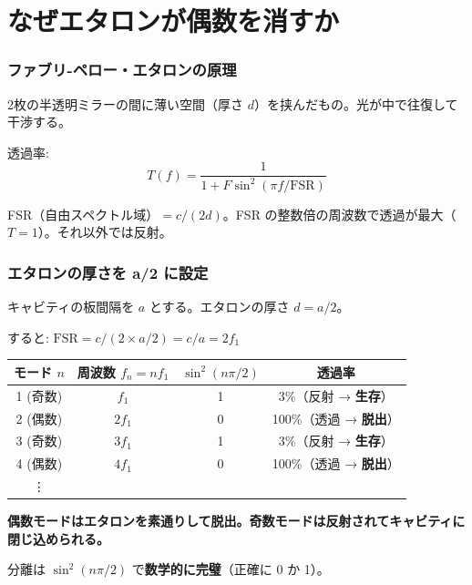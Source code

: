 \documentclass[12pt,a4paper]{article}
\begin{document}
\part{なぜエタロンが偶数を消すか}

\section{ファブリ-ペロー・エタロンの原理}

\begin{mathbox}[エタロン]
2枚の半透明ミラーの間に薄い空間（厚さ $d$）を挟んだもの。光が中で往復して干渉する。

透過率:
$$T(f) = \frac{1}{1 + F\sin^2(\pi f / \text{FSR})}$$

FSR（自由スペクトル域）$= c/(2d)$。FSR の整数倍の周波数で透過が最大（$T=1$）。それ以外では反射。
\end{mathbox}

\section{エタロンの厚さを a/2 に設定}

キャビティの板間隔を $a$ とする。エタロンの厚さ $d = a/2$。

すると: $\text{FSR} = c/(2 \times a/2) = c/a = 2f_1$

\begin{center}
\renewcommand{\arraystretch}{1.3}
\begin{tabular}{cccc}
\toprule
モード $n$ & 周波数 $f_n = nf_1$ & $\sin^2(n\pi/2)$ & 透過率 \\
\midrule
1 (奇数) & $f_1$ & 1 & 3\%（反射 → \textbf{生存}） \\
2 (偶数) & $2f_1$ & 0 & 100\%（透過 → \textbf{脱出}） \\
3 (奇数) & $3f_1$ & 1 & 3\%（反射 → \textbf{生存}） \\
4 (偶数) & $4f_1$ & 0 & 100\%（透過 → \textbf{脱出}） \\
\vdots & & & \\
\bottomrule
\end{tabular}
\end{center}

\textbf{偶数モードはエタロンを素通りして脱出。奇数モードは反射されてキャビティに閉じ込められる。}

分離は $\sin^2(n\pi/2)$ で\textbf{数学的に完璧}（正確に 0 か 1）。
\end{document}
